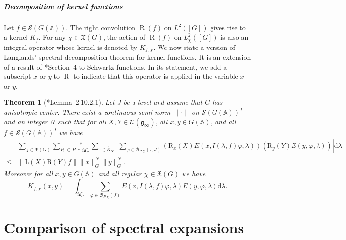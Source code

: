 \documentclass[letterpaper,11pt]{amsart}
\newcommand{\fa}{\mathfrak{a}}
\newcommand{\fg}{\mathfrak{g}}
\newcommand{\fX}{\mathfrak{X}}
\newcommand{\bA}{\mathbb{A}}
\newcommand{\cB}{\mathcal{B}}
\newcommand{\cS}{\mathcal{S}}
\newcommand{\cU}{\mathcal{U}}
\newcommand{\rd}{\mathrm{d}}
\newcommand{\<}{\negthickspace}
\providecommand{\aabs}[1]{\lVert#1\rVert}
\newcommand{\valP}[1]{\left|#1\right|}
\DeclareMathOperator{\rR}{R}
\theoremstyle{definition}
\theoremstyle{plain}
\newtheorem{theorem}[definition]{Theorem}
\theoremstyle{remark}
\numberwithin{equation}{section}
\begin{document}
\subsubsection{Decomposition of kernel functions}
\label{subsec:kernel_functions}

Let $f \in \cS(G(\bA))$. The right convolution $\rR(f)$ on $L^2([G])$ gives rise to a kernel $K_f$. For any $\chi \in \fX(G)$, the action of $\rR(f)$ on $L_\chi^2([G])$ is also an integral operator whose kernel is denoted by $K_{f,\chi}$. We now state a version of Langlands' spectral decomposition theorem for kernel functions. It is an extension of a result of \cite{Arthur3}*{Section~4} to Schwartz functions. In its statement, we add a subscript $x$ or $y$ to $\rR$ to indicate that this operator is applied in the variable $x$ or $y$. 

\begin{theorem}[{\cite{BPCZ}*{Lemma~2.10.2.1}}]   \label{thm:kernel_spectral_expansion}
    Let $J$ be a level and assume that $G$ has anisotropic center. There exist a continuous semi-norm $\aabs{\cdot}$ on $\cS(G(\bA))^J$ and an integer
    $N$ such that for all $X, Y \in \cU(\fg_{\infty})$, all $x, y \in G(\bA)$,
    and all $f \in \cS(G(\bA))^J$ we have 
        \[
        \begin{aligned}
        &\sum_{\chi \in \fX(G)} \sum_{P_0 \subset P}
        \int_{i \fa_{P}^{*}} \sum_{\tau \in \widehat{K}_\infty}
        \valP{\sum_{\varphi \in \cB_{P, \chi}(\tau,J)}
        \left( \mathrm{R}_x(X) E(x, I(\lambda, f) \varphi, \lambda) \right)
        \left( \mathrm{R}_y(Y) E(y, \varphi, \lambda) \right)} \rd  \lambda\\
        \leq &\aabs{\mathrm{L}(X) \mathrm{R}(Y)f}
        \aabs{x}_G^N \aabs{y}_G^N.
        \end{aligned}
        \]
        Moreover for all $x, y \in G(\bA)$ and all regular $\chi \in \fX(G)$ we have
    \begin{equation}
    \label{eq:spectral_expansion_kernel}
          K_{f, \chi}(x, y) = 
        \int_{i \fa_P^{*}} \sum_{\varphi \in \cB_{P, \chi}(J)}
        E(x, I(\lambda, f) \varphi, \lambda)
        \overline{E(y, \varphi, \lambda)} \rd \lambda.
    \end{equation}
      \end{theorem}

\part{Comparison of spectral expansions}
\label{part:corank_zero}
\end{document}
